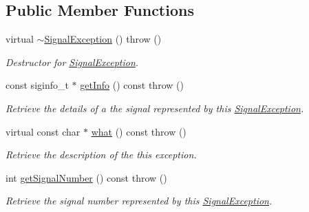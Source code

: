 \subsection*{\-Public \-Member \-Functions}
\begin{DoxyCompactItemize}
\item 
virtual \hyperlink{classLibWheel_1_1SignalException_ade84b65584b146e9402ab0692921d0b4}{$\sim$\-Signal\-Exception} ()  throw ()
\begin{DoxyCompactList}\small\item\em \-Destructor for \hyperlink{classLibWheel_1_1SignalException}{\-Signal\-Exception}. \end{DoxyCompactList}\item 
const siginfo\-\_\-t $\ast$ \hyperlink{classLibWheel_1_1SignalException_a470409aa1db7608623c601c9bda573f4}{get\-Info} () const   throw ()
\begin{DoxyCompactList}\small\item\em \-Retrieve the details of a the signal represented by this \hyperlink{classLibWheel_1_1SignalException}{\-Signal\-Exception}. \end{DoxyCompactList}\item 
virtual const char $\ast$ \hyperlink{classLibWheel_1_1SignalException_a65ea3c23ec24f6448fb02624f9b039c2}{what} () const   throw ()
\begin{DoxyCompactList}\small\item\em \-Retrieve the description of the this exception. \end{DoxyCompactList}\item 
int \hyperlink{classLibWheel_1_1SignalException_a966b7c3d4054dd0a6c5121ae6d17d8cb}{get\-Signal\-Number} () const   throw ()
\begin{DoxyCompactList}\small\item\em \-Retrieve the signal number represented by this \hyperlink{classLibWheel_1_1SignalException}{\-Signal\-Exception}. \end{DoxyCompactList}\end{DoxyCompactItemize}
